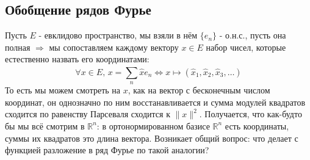 \documentclass[12pt]{article}
\newcommand{\MR}{\mathbb{R}}
\theoremstyle{definition}
\newcommand{\ddsum}[2]{\displaystyle\sum\limits_{#1}^{#2}}
\begin{document}
\subsection*{Обобщение рядов Фурье}
Пусть $E$ - евклидово пространство, мы взяли в нём $\{e_n\}$ - о.н.с., пусть она полная $\Rightarrow$ мы сопоставляем каждому вектору $x\in E$ набор чисел, которые естественно назвать его координатами:
$$
	\forall x \in E, \, x = \ddsum{n}{}\hat{x}e_n \Leftrightarrow x \mapsto (\hat{x}_1, \hat{x}_2, \hat{x}_3, \dotsc)
$$
То есть мы можем смотреть на $x$, как на вектор с бесконечным числом координат, он однозначно по ним восстанавливается и сумма модулей квадратов сходится по равенству Парсеваля сходится к $\|x\|^2$. Получается, что как-будто бы мы всё смотрим в $\MR^n$: в ортонормированном базисе $\MR^n$ есть координаты, суммы их квадратов это длина вектора. Возникает общий вопрос: что делает с функцией разложение в ряд Фурье по такой аналогии?
\end{document}
